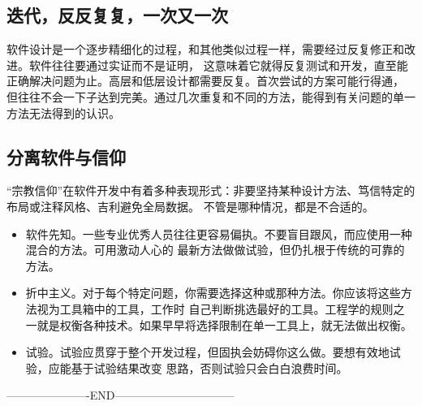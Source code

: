 \documentclass{article}
\begin{document}
\subsection{迭代，反反复复，一次又一次}
软件设计是一个逐步精细化的过程，和其他类似过程一样，需要经过反复修正和改进。软件往往要通过实证而不是证明，
这意味着它就得反复测试和开发，直至能正确解决问题为止。高层和低层设计都需要反复。首次尝试的方案可能行得通，
但往往不会一下子达到完美。通过几次重复和不同的方法，能得到有关问题的单一方法无法得到的认识。

\subsection{分离软件与信仰}
“宗教信仰”在软件开发中有着多种表现形式：非要坚持某种设计方法、笃信特定的布局或注释风格、吉利避免全局数据。
不管是哪种情况，都是不合适的。
\begin{itemize}
    \item 软件先知。一些专业优秀人员往往更容易偏执。不要盲目跟风，而应使用一种混合的方法。可用激动人心的
    最新方法做做试验，但仍扎根于传统的可靠的方法。
    \item 折中主义。对于每个特定问题，你需要选择这种或那种方法。你应该将这些方法视为工具箱中的工具，工作时
    自己判断挑选最好的工具。工程学的规则之一就是权衡各种技术。如果早早将选择限制在单一工具上，就无法做出权衡。
    \item 试验。试验应贯穿于整个开发过程，但固执会妨碍你这么做。要想有效地试验，应能基于试验结果改变
    思路，否则试验只会白白浪费时间。
\end{itemize}

----------------------END--------------------------------
\end{document}
